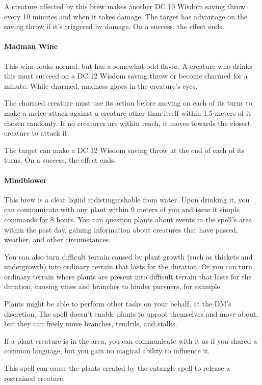    A creature affected by this brew makes another DC 10 Wisdom saving throw every 10 minutes and when it takes damage.
    The target has advantage on the saving throw if it's triggered by damage.
    On a success, the effect ends.
\paragraph{Madman Wine} %
    This wine looks normal, but has a somewhat odd flavor.
    A creature who drinks this must succeed on a DC 12 Wisdom saving throw or become charmed for a minute.
    While charmed, madness glows in the creature's eyes.

    The charmed creature must use its action before moving on each of its turns to make a melee attack against a creature other than itself within 1.5 meters of it chosen randomly.
    If no creatures are within reach, it moves towards the closest creature to attack it.

    The target can make a DC 12 Wisdom saving throw at the end of each of its turns.
    On a success, the effect ends.
\paragraph{Mindblower} %
    This brew is a clear liquid indistinguishable from water.
    Upon drinking it, you can communicate with any plant within 9 meters of you and issue it simple commands for 8 hours.
    You can question plants about events in the spell's area within the past day, gaining information about creatures that have passed, weather, and other circumstances.

    You can also turn difficult terrain caused by plant growth (such as thickets and undergrowth) into ordinary terrain that lasts for the duration.
    Or you can turn ordinary terrain where plants are present into difficult terrain that lasts for the duration, causing vines and branches to hinder pursuers, for example.

    Plants might be able to perform other tasks on your behalf, at the DM's discretion. The spell doesn't enable plants to uproot themselves and move about, but they can freely move branches, tendrils, and stalks.

    If a plant creature is in the area, you can communicate with it as if you shared a common language, but you gain no magical ability to influence it.

    This spell can cause the plants created by the entangle spell to release a restrained creature.

